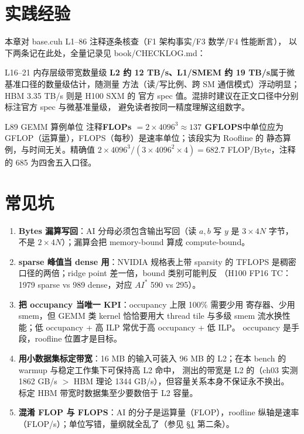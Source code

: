 \section{实践经验}\label{sec:ch01-kaogu}

本章对 base.cuh L1--86 注释逐条核查（F1 架构事实/F3 数学/F4 性能断言），
以下两条记在此处，全量记录见 book/CHECKLOG.md：

\begin{kaogu}[F4]{L16--21 内存层级带宽数量级}
\textbf{L2 约 12 TB/s、L1/SMEM 约 19 TB/s}属于微基准口径的数量级估计，随测量
方法（读/写比例、跨 SM 通信模式）浮动明显；HBM 3.35 TB/s 则是 H100 SXM 的
官方 spec 值。混排时建议在正文口径中分别标注官方 spec 与微基准量级，
避免读者按同一精度理解这组数字。
\end{kaogu}

\begin{kaogu}[F3]{L89 GEMM 算例单位}
注释\textbf{FLOPs $= 2 \times 4096^3 \approx 137$ GFLOPS}中单位应为
GFLOP（运算量），FLOPS（每秒）是速率单位；该段实为 Roofline 的
静态算例，与时间无关。精确值 $2 \times 4096^3 / (3 \times 4096^2 \times 4)
= 682.7$ FLOP/Byte，注释的 685 为四舍五入口径。
\end{kaogu}

\section{常见坑}\label{sec:ch01-pitfall}

\begin{enumerate}
\item \textbf{Bytes 漏算写回}：AI 分母必须包含输出写回（读 $a,b$ 写 $y$
  是 $3 \times 4N$ 字节，不是 $2 \times 4N$）；漏算会把 memory-bound 算成
  compute-bound。
\item \textbf{sparse 峰值当 dense 用}：NVIDIA 规格表上带 sparsity 的
  TFLOPS 是稠密口径的两倍；ridge point 差一倍，bound 类别可能判反
  （H100 FP16 TC：1979 sparse vs 989 dense，对应 $AI^{*}$ 590 vs 295）。
\item \textbf{把 occupancy 当唯一 KPI}：occupancy 上限 100\% 需要少用
  寄存器、少用 smem，但 GEMM 类 kernel 恰恰要用大 thread tile 与多级
  smem 流水换性能；低 occupancy + 高 ILP 常优于高 occupancy + 低 ILP。
  occupancy 是手段，roofline 位置才是目标。
\item \textbf{用小数据集标定带宽}：16 MB 的输入可装入 96 MB 的 L2；在本 bench 的 warmup 与稳定工作集下可保持高 L2 命中，
  测出的带宽是 L2 的（ch03 实测 1862 GB/s $>$ HBM 理论 1344 GB/s），但容量关系本身不保证永不换出。
  标定 HBM 带宽时数据集至少要数倍于 L2 容量。
\item \textbf{混淆 FLOP 与 FLOPS}：AI 的分子是运算量（FLOP），roofline
  纵轴是速率（FLOP/s）；单位写错，量纲就全乱了（参见
  \S\ref{sec:ch01-kaogu} 第二条）。
\end{enumerate}

